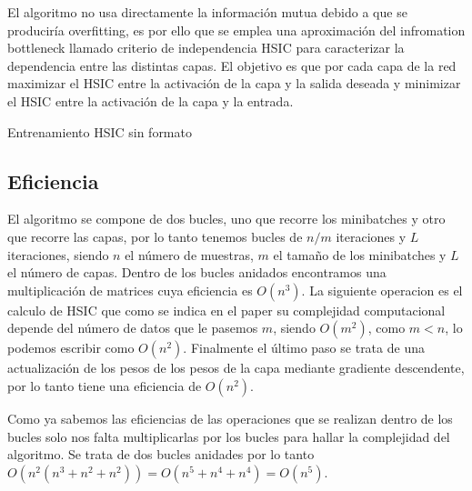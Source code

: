 El algoritmo no usa directamente la información mutua debido a que se produciría overfitting, es por ello que se emplea una aproximación del infromation bottleneck llamado criterio de independencia HSIC para caracterizar la dependencia entre las distintas capas. El objetivo es que por cada capa de la red maximizar el HSIC entre la activación de la capa y la salida deseada y minimizar el HSIC entre la activación de la capa y la entrada.

\begin{algorithm}
   \caption{Entrenamiento HSIC sin formato}
   
   
\end{algorithm}

\subsection{Eficiencia}


El algoritmo se compone de dos bucles, uno que recorre los minibatches y otro que recorre las capas, por lo tanto tenemos bucles de $n/m$ iteraciones y $L$ iteraciones, siendo $n$ el número de muestras, $m$ el tamaño de los minibatches y $L$ el número de capas. Dentro de los bucles anidados encontramos una multiplicación de matrices cuya eficiencia es $O(n^3)$. La siguiente operacion es el calculo de HSIC que como se indica en el paper su complejidad computacional depende del número de datos que le pasemos $m$, siendo $O(m^2)$, como $m < n$, lo podemos escribir como $O(n^2)$. Finalmente el último paso se trata de una actualización de los pesos de los pesos de la capa mediante gradiente descendente, por lo tanto tiene una eficiencia de $O(n^2)$. 

Como ya sabemos las eficiencias de las operaciones que se realizan dentro de los bucles solo nos falta multiplicarlas por los bucles para hallar la complejidad del algoritmo. Se trata de dos bucles anidades por lo tanto $O(n^{2}(n^{3}+n^{2}+n^{2})) = O(n^{5}+n^{4}+n^{4}) = O(n^{5})$.


